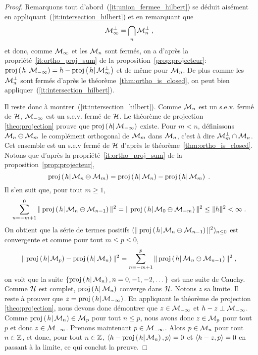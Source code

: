 \begin{proof}
Remarquons tout d'abord~(\ref{it:union_fermee_hilbert}) se d\'{e}duit ais\'{e}ment en
appliquant~(\ref{it:intersection_hilbert}) et en remarquant que
$$
\mathcal{M}_\infty^\perp= \bigcap_n \mathcal{M}_n^\perp\;,
$$
et donc, comme $\mathcal{M}_\infty$ et les $\mathcal{M}_n$ sont ferm\'{e}s, on a d'apr\`{e}s la
propri\'{e}t\'{e}~\ref{it:ortho_proj_sum} de la proposition~\ref{prop:projecteur}:
$\proj{h}{\cM_{-\infty}}=h-\proj{h}{\cM_\infty^\perp}$
et de m\^{e}me pour  $\mathcal{M}_n$. De plus comme les $\mathcal{M}_n^\perp$ sont ferm\'{e}s d'apr\`{e}s
le th\'{e}or\`{e}me~\ref{thm:ortho_is_closed}, on peut bien
appliquer~(\ref{it:intersection_hilbert}).

Il reste donc \`{a} montrer~(\ref{it:intersection_hilbert}).
Comme $\mathcal{M}_n$ est un s.e.v. ferm\'{e} de $\mathcal{H}$, $\mathcal{M}_{-\infty}$ est un s.e.v. ferm\'{e}
de $\mathcal{H}$. Le th\'{e}or\`{e}me de projection \ref{theo:projection} prouve que
$\proj{h}{\cM_{- \infty}}$ existe. Pour $m < n$, d\'{e}finissons $\mathcal{M}_n \ominus
\mathcal{M}_m$ le compl\'{e}ment orthogonal de $\mathcal{M}_m$ dans $\mathcal{M}_n$, c'est \`{a} dire
$\mathcal{M}_m^\perp\cap\mathcal{M}_n$. Cet ensemble est un s.e.v ferm\'{e} de $\mathcal{H}$ d'apr\`{e}s le
th\'{e}or\`{e}me~\ref{thm:ortho_is_closed}.  Notons que d'apr\`{e}s la
propri\'{e}t\'{e}~\ref{it:ortho_proj_sum} de la proposition~\ref{prop:projecteur},
\[
\proj{h}{\cM_n \ominusperp \cM_m} = \proj{h}{\cM_n} - \proj{h}{\cM_m} \eqsp.
\]
Il s'en suit que, pour tout $m \geq 1$,
\[
\sum_{n= -m+1}^0 \| \proj{h}{ \cM_n \ominusperp \cM_{n-1}} \|^2 = \| \proj{h}{\cM_0
  \ominusperp \cM_{-m}} \|^2 \leq \|h\|^2 < \infty\;.
\]
On obtient que la s\'{e}rie de termes positifs  $(\| \proj{h}{ \cM_n \ominusperp
  \cM_{n-1}} \|^2)_{n\leq0}$ est convergente et comme pour tout $m\leq p\leq 0$,
$$
\|\proj{h}{\cM_p}-\proj{h}{\cM_n}\|^2=
\sum_{n= -m+1}^p \| \proj{h}{ \cM_n \ominusperp \cM_{n-1}} \|^2\;,
$$
on voit que la suite $\{ \proj{h}{\cM_n}, n=0,-1,-2, \dots \}$ est une suite
de Cauchy.  Comme $\mathcal{H}$ est complet, $\proj{h}{\cM_n}$ converge dans
$\mathcal{H}$. Notons $z$ sa limite. Il
reste \`{a} prouver que $z = \proj{h}{\cM_{- \infty}}$. En appliquant le
th\'{e}or\`{e}me de projection \ref{theo:projection}, nous devons
donc d\'{e}montrer que $z \in \mathcal{M}_{- \infty}$ et $h-z \perp
\mathcal{M}_{- \infty}$. Comme $\proj{h}{\cM_n} \in \cM_p$ pour tout $n \leq p$, nous
avons donc $z \in \mathcal{M}_p$ pour
tout $p$ et donc $z \in \mathcal{M}_{-\infty}$. Prenons maintenant $p \in \mathcal{M}_{-
  \infty}$. Alors $p \in
\mathcal{M}_{n}$ pour tout $n \in \mathbb{Z}$, et donc, pour tout $n \in \mathbb{Z}$,
$\pscal{h - \proj{h}{\cM_n}}{p}= 0$ et $\left\langle h - z, p \right\rangle=0$ en passant \`{a} la
limite, ce qui conclut la preuve.

\end{proof}

